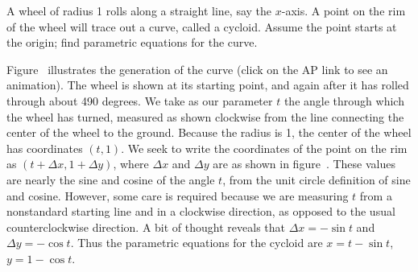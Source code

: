 \begin{example} A wheel of radius 1 rolls along a straight line, say the
$x$-axis. A point on the rim of the wheel will trace out a curve, called a
cycloid. Assume the point starts at the origin; find
parametric equations for the curve.

Figure~ illustrates the generation of the curve
(click on the AP link to see an animation). The wheel is shown at its
starting point, and again after it has rolled through about 490
degrees. We take as our parameter $t$ the angle through which the
wheel has turned, measured as shown clockwise from the line connecting
the center of the wheel to the ground. Because the radius is 1, the
center of the wheel has coordinates $(t,1)$. We seek to write the
coordinates of the point on the rim as $(t+\Delta x,1+\Delta y)$,
where $\Delta x$ and $\Delta y$ are as shown in figure~. These values are nearly the sine and cosine of the
angle $t$, from the unit circle definition of sine and
cosine. However, some care is required because we are measuring $t$
from a nonstandard starting line and in a clockwise direction, as
opposed to the usual counterclockwise direction. A bit of thought
reveals that $\Delta x=-\sin t$ and $\Delta y=-\cos t$. Thus the
parametric equations for the cycloid are $x=t-\sin t$, $y=1-\cos t$.
\end{example}

